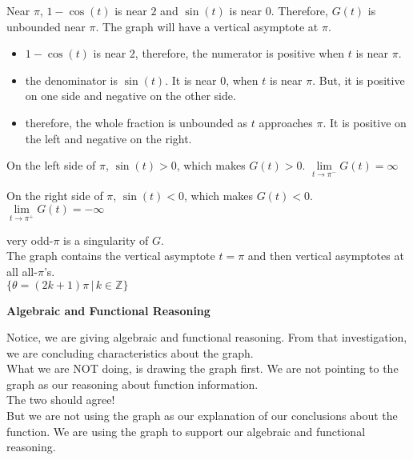 \documentclass{ximera}
\begin{document}
Near $\pi$, $1-\cos(t)$ is near $2$ and $\sin(t)$ is near $0$.  Therefore, $G(t)$ is unbounded near $\pi$.  The graph will have a vertical asymptote at $\pi$.


\begin{itemize}
\item $1-\cos(t)$ is near $2$, therefore, the numerator is positive when $t$ is near $\pi$.
\item the denominator is $\sin(t)$. It is near $0$, when $t$ is near $\pi$. But, it is positive on one side and negative on the other side.
\item therefore, the whole fraction is unbounded as $t$ approaches $\pi$.  It is positive on the left and negative on the right.
\end{itemize}




On the left side of $\pi$, $\sin(t) > 0$, which makes $G(t) > 0$.   $\lim\limits_{t \to \pi^{-}}G(t) = \infty$ 

On the right side of $\pi$, $\sin(t) < 0$, which makes $G(t) < 0$.   $\lim\limits_{t \to \pi^{+}}G(t) = -\infty$ 








very odd-$\pi$ is a singularity of $G$.\\


The graph contains the vertical asymptote $t=\pi$ and then vertical asymptotes at all all-$\pi$'s. \\




$\{  \theta = (2k+1) \pi \, | \, k \in \mathbb{Z}   \}$




\begin{warning} \textbf{\textcolor{red!80!black}{Algebraic and Functional Reasoning}}


Notice, we are giving algebraic and functional reasoning.  From that investigation, we are concluding characteristics about the graph. \\

What we are NOT doing, is drawing the graph first.  We are not pointing to the graph as our reasoning about function information. \\


The two should agree!  \\

But we are not using the graph as our explanation of our conclusions about the function.  We are using the graph to support our algebraic and functional reasoning.


\end{warning}
\end{document}
